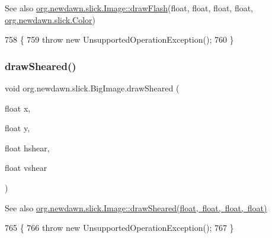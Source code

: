 \begin{DoxySeeAlso}{See also}
\mbox{\hyperlink{classorg_1_1newdawn_1_1slick_1_1_image_a5413e23c618b2219effab1115eab40eb}{org.\+newdawn.\+slick.\+Image\+::draw\+Flash}}(float, float, float, float, \mbox{\hyperlink{classorg_1_1newdawn_1_1slick_1_1_color}{org.\+newdawn.\+slick.\+Color}}) 
\end{DoxySeeAlso}

\begin{DoxyCode}
758                                                                                   \{
759         \textcolor{keywordflow}{throw} \textcolor{keyword}{new} UnsupportedOperationException();
760     \}
\end{DoxyCode}
\mbox{\label{classorg_1_1newdawn_1_1slick_1_1_big_image_a9d88e551d8e8f9d5ca8e10180d9c47ca}} 
\subsubsection{\texorpdfstring{draw\+Sheared()}{drawSheared()}}
{\footnotesize\ttfamily void org.\+newdawn.\+slick.\+Big\+Image.\+draw\+Sheared (\begin{DoxyParamCaption}\item[{float}]{x,  }\item[{float}]{y,  }\item[{float}]{hshear,  }\item[{float}]{vshear }\end{DoxyParamCaption})\hspace{0.3cm}{\ttfamily [inline]}}

\begin{DoxySeeAlso}{See also}
\mbox{\hyperlink{classorg_1_1newdawn_1_1slick_1_1_image_ad1a02d31db5b4428fdd1f76669104669}{org.\+newdawn.\+slick.\+Image\+::draw\+Sheared(float, float, float, float)}} 
\end{DoxySeeAlso}

\begin{DoxyCode}
765                                                                           \{
766         \textcolor{keywordflow}{throw} \textcolor{keyword}{new} UnsupportedOperationException();
767     \}
\end{DoxyCode}
\mbox{\label{classorg_1_1newdawn_1_1slick_1_1_big_image_ae7b6a5090b09207d602ec851cbe98985}} 
